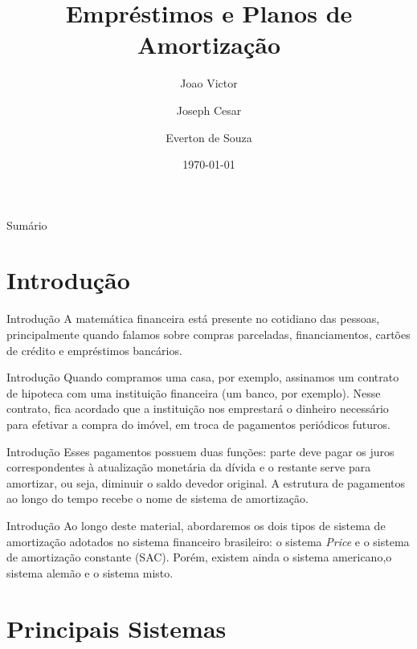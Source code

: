 \documentclass[12pt]{beamer}
\author[Joao Victor]{%
	Joao Victor\inst{1} \and Joseph Cesar\inst{2} \and Everton de Souza\inst{3}}
\title[Planos de Amortização]{Empréstimos e Planos de Amortização}
\institute[]{%
	\textsuperscript{1,2,3} Graduando em Matemática
}
\date{\today}
\begin{document}
	\onehalfspacing 
	\justifying 
	
	\begin{frame}
		\titlepage
	\end{frame}
	
	\begin{frame}{Sumário}
		\tableofcontents
	\end{frame}
	
	\section{Introdução}
	
		\begin{frame}{Introdução}
			\justifying
			A matemática financeira está presente no cotidiano das pessoas, principalmente quando falamos sobre compras parceladas, financiamentos, cartões de crédito e empréstimos bancários.
		\end{frame}
	
		\begin{frame}{Introdução}
			\justifying
			Quando compramos uma casa, por exemplo, assinamos um contrato de hipoteca com uma instituição financeira (um banco, por exemplo). Nesse contrato, fica acordado que a instituição nos emprestará o dinheiro necessário para efetivar a compra do imóvel, em troca de pagamentos
			periódicos futuros.
		\end{frame}
		
		
		\begin{frame}{Introdução}
			\justifying
			Esses pagamentos possuem duas funções: parte deve pagar os juros correspondentes à atualização monetária da dívida e o restante serve para amortizar, ou seja, diminuir o saldo devedor original. A estrutura de pagamentos ao longo do tempo recebe o nome de sistema de amortização.
		\end{frame}
		
		\begin{frame}{Introdução}
			\justifying
			Ao longo deste material, abordaremos os dois tipos de
			sistema de amortização adotados no sistema financeiro brasileiro: o sistema \textit{Price} e o sistema de amortização constante (SAC). Porém, existem ainda o sistema americano,o sistema alemão e o sistema misto.
		\end{frame}
	
	
	\section{Principais Sistemas}
		
\end{document}
